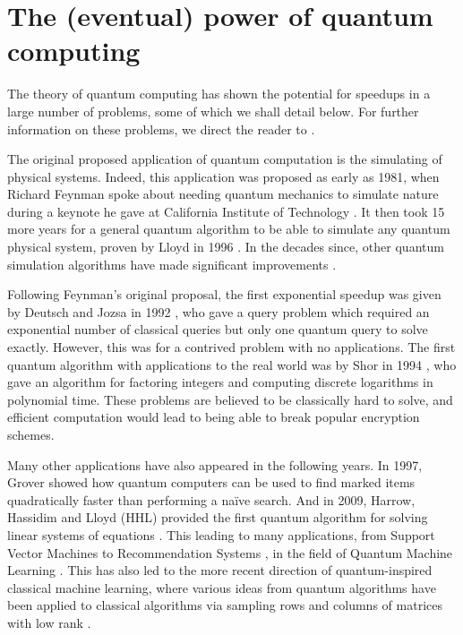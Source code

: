 \section{The (eventual) power of quantum computing}
\label{sec:eventual-power}

The theory of quantum computing has shown the potential for speedups in a large number of problems, some of which we shall detail below. For further information on these problems, we direct the reader to \cite{montanaro2016}.

The original proposed application of quantum computation is the simulating of physical systems. Indeed, this application was proposed as early as 1981, when Richard Feynman spoke about needing quantum mechanics to simulate nature during a keynote he gave at California Institute of Technology \cite{feynman1982}. It then took 15 more years for a general quantum algorithm to be able to simulate any quantum physical system, proven by Lloyd in 1996 \cite{lloyd1996}. In the decades since, other quantum simulation algorithms have made significant improvements \cite{berry2015, berry2015stoc, low2017}.

Following Feynman's original proposal, the first exponential speedup was given by Deutsch and Jozsa in 1992 \cite{deutsch1992}, who gave a query problem which required an exponential number of classical queries but only one quantum query to solve exactly. However, this was for a contrived problem with no applications. The first quantum algorithm with applications to the real world was by Shor in 1994 \cite{shor1994}, who gave an algorithm for factoring integers and computing discrete logarithms in polynomial time. These problems are believed to be classically hard to solve, and efficient computation would lead to being able to break popular encryption schemes.

Many other applications have also appeared in the following years. In 1997, Grover \cite{grover96} showed how quantum computers can be used to find marked items quadratically faster than performing a na\"ive search. And in 2009, Harrow, Hassidim and Lloyd (HHL) provided the first quantum algorithm for solving linear systems of equations \cite{harrow2009}. This leading to many applications, from Support Vector Machines \cite{rebentrost2014} to Recommendation Systems \cite{kerenidis2017}, in the field of Quantum Machine Learning \cite{wittek2014, schuld2014, adcock2015, biamonte2017}. This has also led to the more recent direction of quantum-inspired classical machine learning, where various ideas from quantum algorithms have been applied to classical algorithms via sampling rows and columns of matrices with low rank \cite{tang2019, tang2018, gilyen2018, arrazola2019, chia2019, jethwani2019}.

